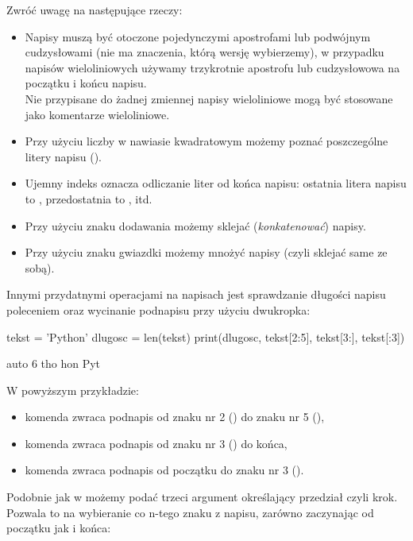 \pagebreak[2]\noindent
Zwróć uwagę na następujące rzeczy:
\begin{itemize}
\item Napisy muszą być otoczone pojedynczymi apostrofami lub podwójnym cudzysłowami (nie ma znaczenia,
	którą wersję wybierzemy), w przypadku napisów wieloliniowych używamy trzykrotnie apostrofu lub cudzysłowowa na początku i końcu napisu.\\
	Nie przypisane do żadnej zmiennej napisy wieloliniowe mogą być stosowane jako komentarze wieloliniowe.
\item Przy użyciu liczby w nawiasie kwadratowym możemy poznać poszczególne litery napisu ().
\item Ujemny indeks oznacza odliczanie liter od końca napisu: ostatnia litera napisu  to ,
	przedostatnia to , itd.
\item Przy użyciu znaku dodawania możemy sklejać (\emph{konkatenować}) napisy.
\item Przy użyciu znaku gwiazdki możemy mnożyć napisy (czyli sklejać same ze sobą).
\end{itemize}
Innymi przydatnymi operacjami na napisach jest sprawdzanie długości napisu poleceniem 
oraz wycinanie podnapisu przy użyciu dwukropka:

\begin{CodeFrame}[python]{.7\textwidth}
tekst = 'Python'
dlugosc = len(tekst)
print(dlugosc, tekst[2:5], tekst[3:], tekst[:3])
\end{CodeFrame}
\begin{CodeFrame}{auto}
6 tho hon Pyt
\end{CodeFrame}

\pagebreak[2]\noindent
W powyższym przykładzie:
\begin{itemize}
\item komenda  zwraca podnapis od znaku nr 2 () do znaku nr 5 
(),
\item komenda  zwraca podnapis od znaku nr 3 () do końca, 
\item komenda  zwraca podnapis od początku do znaku nr 3 
().
\end{itemize}

Podobnie jak w  możemy podać trzeci argument określający przedział czyli krok.
Pozwala to na wybieranie co n-tego znaku z napisu, zarówno zaczynając od początku jak i końca:

